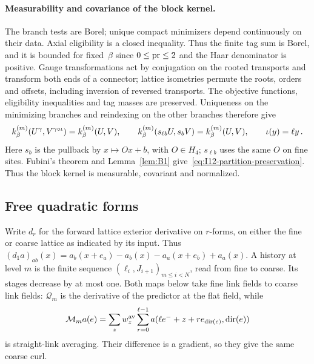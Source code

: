 \paragraph{Measurability and covariance of the block kernel.}
The branch tests are Borel; unique compact minimizers depend continuously on their data. Axial eligibility is a closed inequality. Thus the finite tag sum is Borel, and it is bounded for fixed~$\beta$ since $0\le\operatorname{pr}\le2$ and the Haar denominator is positive. Gauge transformations act by conjugation on the rooted transports and transform both ends of a connector; lattice isometries permute the roots, orders and offsets, including inversion of reversed transports. The objective functions, eligibility inequalities and tag masses are preserved. Uniqueness on the minimizing branches and reindexing on the other branches therefore give
\begin{equation*}
k^{(m)}_\beta(U^\gamma,V^{\gamma\circ\iota})=k^{(m)}_\beta(U,V),\qquad
k^{(m)}_\beta(s_{\ell b}U,s_bV)=k^{(m)}_\beta(U,V),\qquad \iota(y)=\ell y\,.
\end{equation*}
Here $s_b$ is the pullback by $x\mapsto Ox+b$, with $O\in H_4$; $s_{\ell b}$ uses the same $O$ on fine sites. Fubini's theorem and Lemma~\ref{lem:B1} give~\eqref{eq:I12-partition-preservation}. Thus the block kernel is measurable, covariant and normalized.

\subsection{Free quadratic forms}\label{subsec:B-free}

Write $d_r$ for the forward lattice exterior derivative on $r$-forms, on either the fine or coarse lattice as indicated by its input. Thus $(d_1a)_{ab}(x)=a_b(x+e_a)-a_b(x)-a_a(x+e_b)+a_a(x)$. A history at level $m$ is the finite sequence $(\ell_i,J_{i+1})_{m\le i<N}$, read from fine to coarse. Its stages decrease by at most one. Both maps below take fine link fields to coarse link fields: $\mathcal Q_m$ is the derivative of the predictor at the flat field, while
\begin{equation*}
\mathcal M_ma(e)=\sum_z w_z^{\rm av}\sum_{r=0}^{\ell-1}a(\ell e^-+z+re_{\operatorname{dir}(e)},\operatorname{dir}(e))
\end{equation*}
is straight-link averaging. Their difference is a gradient, so they give the same coarse curl.

